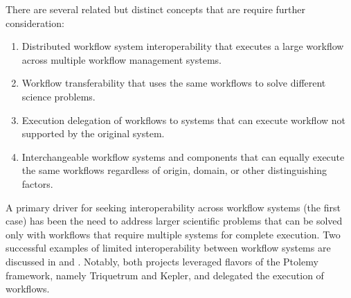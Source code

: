 There are several related but distinct concepts that are require further
consideration:

\begin{enumerate}
\item Distributed workflow system interoperability that executes a
large workflow across multiple workflow management systems. 
\item Workflow transferability that uses the same workflows to solve different
science problems.
\item Execution delegation of workflows to systems that can execute workflow
not supported by the original system. 
\item Interchangeable workflow systems and components that can
equally execute the same workflows regardless of origin, domain,
or other distinguishing factors.
\end{enumerate} 

A primary driver for seeking interoperability across workflow systems (the
first case) has been the need to address larger scientific problems that can
be solved only with workflows that require multiple systems for complete
execution. Two successful examples of limited interoperability between workflow
systems are discussed in \cite{brooks_triquetrum:_2015} and
\cite{mandal_integrating_2007}. Notably, both projects leveraged flavors of the
Ptolemy framework, namely Triquetrum and Kepler, and delegated the execution of
workflows.
